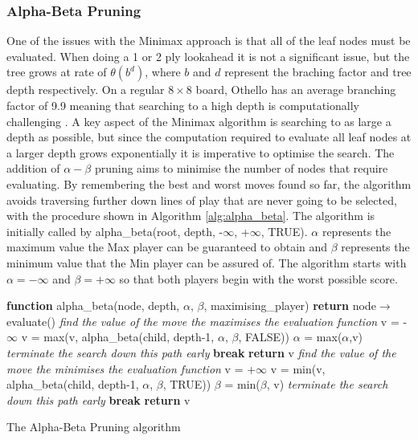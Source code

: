 \documentclass[12pt,a4paper]{article}
\begin{document}
\subsubsection*{Alpha-Beta Pruning}
One of the issues with the Minimax approach is that all of the leaf nodes must be evaluated. When doing a 1 or 2 ply lookahead it is not a significant issue, but the tree grows at rate of $\theta(b^d)$, where $b$ and $d$ represent the braching factor and tree depth respectively. On a regular $8\times8$ board, Othello has an average branching factor of 9.9 meaning that searching to a high depth is computationally challenging \cite{rosenbloom1982world}. A key aspect of the Minimax algorithm is searching to as large a depth as possible, but since the computation required to evaluate all leaf nodes at a larger depth grows exponentially it is imperative to optimise the search. The addition of $\alpha-\beta$ pruning aims to minimise the number of nodes that require evaluating. By remembering the best and worst moves found so far, the algorithm avoids traversing further down lines of play that are never going to be selected, with the procedure shown in Algorithm \ref{alg:alpha_beta}. The algorithm is initially called by alpha\_beta(root, depth, -$\infty$, +$\infty$, TRUE). $\alpha$ represents the maximum value the Max player can be guaranteed to obtain and $\beta$ represents the minimum value that the Min player can be assured of. The algorithm starts with $\alpha = -\infty$ and $\beta = +\infty$ so that both players begin with the worst possible score.

\begin{algorithm}[H]
\begin{algorithmic}[1]

\STATE \textbf{function} alpha\_beta(node, depth, $\alpha$, $\beta$, maximising\_player)
	\STATE \textbf{return} node$\rightarrow$evaluate()
\ENDIF
{}
	\STATE \textit{find the value of the move the maximises the evaluation function}
	\STATE v = -$\infty$
		\STATE v = max(v, alpha\_beta(child, depth-1, $\alpha$, $\beta$, FALSE))
		\STATE $\alpha$ = max($\alpha$,v)
		\IF {$\beta \leq \alpha$}
			\STATE \textit{terminate the search down this path early}
			\STATE \textbf{break}
		\ENDIF
	\ENDFOR
	\STATE \textbf{return} v
\ELSE
\STATE \textit{find the value of the move the minimises the evaluation function}
	\STATE v = +$\infty$
		\STATE v = min(v, alpha\_beta(child, depth-1, $\alpha$, $\beta$, TRUE))
		\STATE $\beta$ = min($\beta$, v)
		\IF {$\beta \leq \alpha$}
			\STATE \textit{terminate the search down this path early}
			\STATE \textbf{break}			
		\ENDIF	
	\ENDFOR
	\STATE \textbf{return} v

\ENDIF
\end{algorithmic}
\caption{The Alpha-Beta Pruning algorithm}
\label{alg:alpha_beta}
\end{algorithm}
\end{document}
